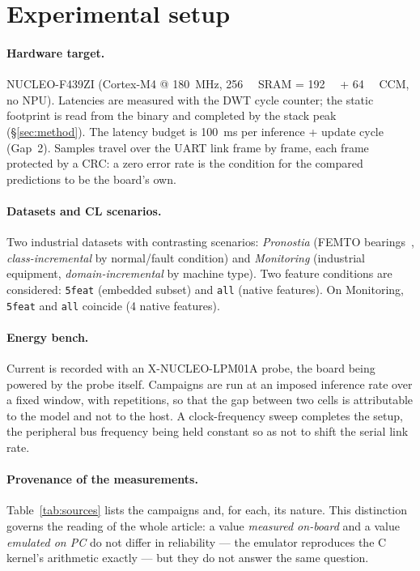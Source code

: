 \section{Experimental setup}
\label{sec:setup}

\paragraph{Hardware target.} NUCLEO-F439ZI (Cortex-M4 @ \SI{180}{\mega\hertz}, \SI{256}{\kilo\byte} SRAM =
\SI{192}{\kilo\byte} + \SI{64}{\kilo\byte} \gls{CCM}, no NPU). Latencies are measured with the DWT cycle
counter; the static footprint is read from the binary and completed by the stack peak
(\S\ref{sec:method}). The latency budget is \SI{100}{\milli\second} per inference + update cycle (Gap~2).
Samples travel over the \gls{UART} link frame by frame, each frame protected by a CRC: a zero error rate is the
condition for the compared predictions to be the board's own.

\paragraph{Datasets and CL scenarios.} Two industrial datasets with contrasting scenarios:
\emph{Pronostia} (FEMTO bearings~\cite{Nectoux2012Pronostia}, \emph{class-incremental} by normal/fault
condition) and \emph{Monitoring} (industrial equipment, \emph{domain-incremental} by machine type). Two
feature conditions are considered: \texttt{5feat} (embedded subset) and \texttt{all} (native features). On
Monitoring, \texttt{5feat} and \texttt{all} coincide (4 native features).

\paragraph{Energy bench.} Current is recorded with an X-NUCLEO-LPM01A probe, the board being powered by
the probe itself. Campaigns are run at an imposed inference rate over a fixed window, with repetitions, so
that the gap between two cells is attributable to the model and not to the host. A clock-frequency sweep
completes the setup, the peripheral bus frequency being held constant so as not to shift the serial link
rate.

\paragraph{Provenance of the measurements.} Table~\ref{tab:sources} lists the campaigns and, for each, its
nature. This distinction governs the reading of the whole article: a value \emph{measured on-board} and a
value \emph{emulated on PC} do not differ in reliability --- the emulator reproduces the C kernel's
arithmetic exactly --- but they do not answer the same question.

